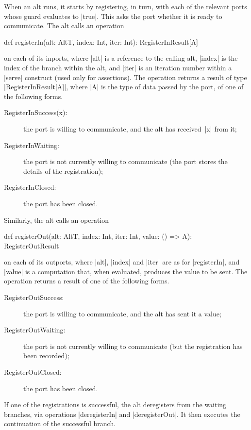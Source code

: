 When an alt runs, it starts by registering, in turn, with each of the relevant
ports whose guard evaluates to |true|.  This asks the port whether it is ready
to communicate.  The alt calls an operation
%
\begin{scala}
def registerIn(alt: AltT, index: Int, iter: Int): RegisterInResult[A]  
\end{scala}
%
on each of its inports, where |alt| is a reference to the calling alt, |index|
is the index of the branch within the alt, and |iter| is an iteration number
within a |serve| construct (used only for assertions).  
The operation returns a
result of type |RegisterInResult[A]|, where |A| is the type of data passed by
the port, of one of the following forms.
%
\begin{description}
\item[\rm{\scalastyle RegisterInSuccess(x)}:] the port is willing to
  communicate, and the alt has received~|x| from it;

\item[\rm{\scalastyle RegisterInWaiting}:] the port is not currently willing to
  communicate (the port stores the details of the registration); 

\item[\rm{\scalastyle RegisterInClosed}:] the port has been closed.
\end{description}
%
Similarly, the alt calls an operation
%
\begin{scala}
def registerOut(alt: AltT, index: Int, iter: Int, value: () => A): RegisterOutResult
\end{scala}
on each of its outports, where |alt|, |index| and |iter| are as for
|registerIn|, and |value| is a computation that, when evaluated, produces the
value to be sent.  The operation returns a result of one of the following
forms.
%
\begin{description}
\item[\rm{\scalastyle RegisterOutSuccess}:] the port is willing to
  communicate, and the alt has sent it a value;

\item[\rm{\scalastyle RegisterOutWaiting}:] the port is not currently willing to
  communicate (but the registration has been recorded); 

\item[\rm{\scalastyle RegisterOutClosed}:] the port has been closed.
\end{description}

If one of the registrations is successful, the alt deregisters from the
waiting branches, via operations |deregisterIn| and |deregisterOut|.  It then
executes the continuation of the successful branch.  

